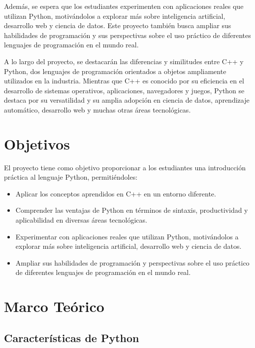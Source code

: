 \documentclass[12pt]{article}
\begin{document}
	Además, se espera que los estudiantes experimenten con aplicaciones reales que utilizan Python, motivándolos a explorar más sobre inteligencia artificial, desarrollo web y ciencia de datos. Este proyecto también busca ampliar sus habilidades de programación y sus perspectivas sobre el uso práctico de diferentes lenguajes de programación en el mundo real.
	
	A lo largo del proyecto, se destacarán las diferencias y similitudes entre C++ y Python, dos lenguajes de programación orientados a objetos ampliamente utilizados en la industria. Mientras que C++ es conocido por su eficiencia en el desarrollo de sistemas operativos, aplicaciones, navegadores y juegos, Python se destaca por su versatilidad y su amplia adopción en ciencia de datos, aprendizaje automático, desarrollo web y muchas otras áreas tecnológicas.
	
	\section{Objetivos}
	El proyecto tiene como objetivo proporcionar a los estudiantes una introducción práctica al lenguaje Python, permitiéndoles:
	\begin{itemize}
		\item Aplicar los conceptos aprendidos en C++ en un entorno diferente.
		\item Comprender las ventajas de Python en términos de sintaxis, productividad y aplicabilidad en diversas áreas tecnológicas.
		\item Experimentar con aplicaciones reales que utilizan Python, motivándolos a explorar más sobre inteligencia artificial, desarrollo web y ciencia de datos.
		\item Ampliar sus habilidades de programación y perspectivas sobre el uso práctico de diferentes lenguajes de programación en el mundo real.
	\end{itemize}
	
	\section{Marco Teórico}
	
	\subsection{Características de Python}
	
\end{document}
